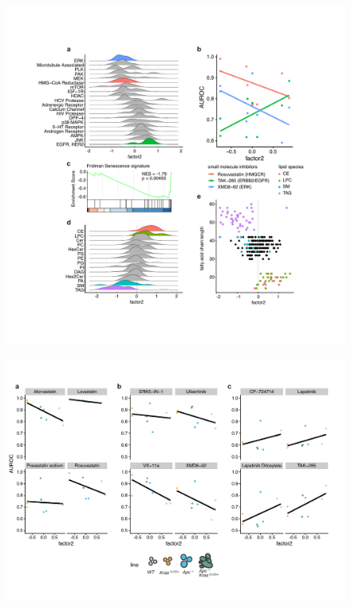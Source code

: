 \begin{flushleft}
\begin{figure}[h]
\centering
\includegraphics[width=\textwidth,
                height=\textheight,
                keepaspectratio]{figures/adenomaprofiling/pdf/fig_3_1.pdf}
\caption{}
\label{fig_180}
\end{figure}
\bigbreak

\begin{figure}[h]
\centering
\includegraphics[width=\textwidth,
                height=\textheight,
                keepaspectratio]{figures/adenomaprofiling/pdf/fig_3_2.pdf}
\caption{}
\label{fig_180}
\end{figure}
\bigbreak


\end{flushleft}
